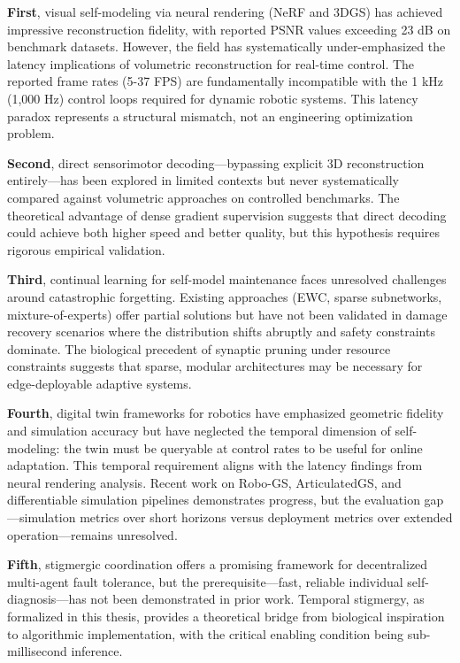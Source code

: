 \documentclass[12pt,a4paper,oneside]{report}
\begin{document}
\textbf{First}, visual self-modeling via neural rendering (NeRF and 3DGS) has achieved impressive reconstruction fidelity, with reported PSNR values exceeding 23 dB on benchmark datasets. However, the field has systematically under-emphasized the latency implications of volumetric reconstruction for real-time control. The reported frame rates (5-37 FPS) are fundamentally incompatible with the 1 kHz (1,000 Hz) control loops required for dynamic robotic systems. This latency paradox represents a structural mismatch, not an engineering optimization problem.

\textbf{Second}, direct sensorimotor decoding—bypassing explicit 3D reconstruction entirely—has been explored in limited contexts but never systematically compared against volumetric approaches on controlled benchmarks. The theoretical advantage of dense gradient supervision suggests that direct decoding could achieve both higher speed and better quality, but this hypothesis requires rigorous empirical validation.

\textbf{Third}, continual learning for self-model maintenance faces unresolved challenges around catastrophic forgetting. Existing approaches (EWC, sparse subnetworks, mixture-of-experts) offer partial solutions but have not been validated in damage recovery scenarios where the distribution shifts abruptly and safety constraints dominate. The biological precedent of synaptic pruning under resource constraints suggests that sparse, modular architectures may be necessary for edge-deployable adaptive systems.

\textbf{Fourth}, digital twin frameworks for robotics have emphasized geometric fidelity and simulation accuracy but have neglected the temporal dimension of self-modeling: the twin must be queryable at control rates to be useful for online adaptation. This temporal requirement aligns with the latency findings from neural rendering analysis. Recent work on Robo-GS, ArticulatedGS, and differentiable simulation pipelines demonstrates progress, but the evaluation gap—simulation metrics over short horizons versus deployment metrics over extended operation—remains unresolved.

\textbf{Fifth}, stigmergic coordination offers a promising framework for decentralized multi-agent fault tolerance, but the prerequisite—fast, reliable individual self-diagnosis—has not been demonstrated in prior work. Temporal stigmergy, as formalized in this thesis, provides a theoretical bridge from biological inspiration to algorithmic implementation, with the critical enabling condition being sub-millisecond inference.
\end{document}
